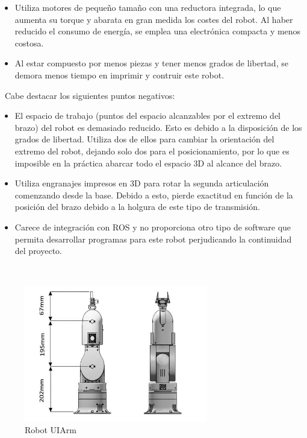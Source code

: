 \begin{itemize}
\begin{itemize}
        \item Utiliza motores de pequeño tamaño con una reductora integrada, lo que aumenta su torque y abarata en gran medida los costes 
        del robot. Al haber reducido el consumo de energía, se emplea una electrónica compacta y menos costosa.
        \item Al estar compuesto por menos piezas y tener menos grados de libertad, se demora menos tiempo en imprimir y contruir este robot.
    \end{itemize}\
    Cabe destacar los siguientes puntos negativos:
    \begin{itemize}
        \item El espacio de trabajo (puntos del espacio alcanzables por el extremo del brazo) del robot es demasiado reducido. Esto es debido 
        a la disposición de los grados de libertad. Utiliza dos de ellos para cambiar la orientación del extremo del robot, dejando solo dos para el 
        posicionamiento, por lo que es imposible en la práctica abarcar todo el espacio 3D al alcance del brazo.
        \item Utiliza engranajes impresos en 3D para rotar la segunda articulación comenzando desde la base. Debido a esto, pierde exactitud en función 
        de la posición del brazo debido a la holgura de este tipo de transmisión.
        \item Carece de integración con \ac{ROS} y no proporciona otro tipo de software que permita desarrollar programas para este robot perjudicando la 
        continuidad del proyecto.
    \end{itemize}\
    \begin{figure} [h!]
        \begin{center}
          \includegraphics[width=8cm]{figs/uiarm.png}
        \end{center}
        \caption{Robot UIArm}
        \label{fig:uiarm}
    \end{figure}\ 
\end{itemize}\
\vspace{1cm}
